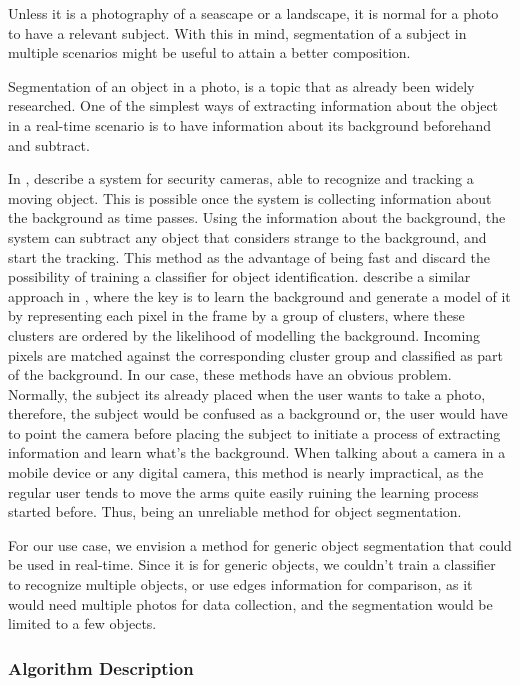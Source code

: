 Unless it is a photography of a seascape or a landscape, it is normal for a photo to have a relevant subject. With this in mind, segmentation of a subject in multiple scenarios might be useful to attain a better composition.

Segmentation of an object in a photo, is a topic that as already been widely researched. One of the simplest ways of extracting information about the object in a real-time scenario is to have information about its background beforehand and subtract. 

In \cite{yang2004real}, \citeauthor{yang2004real} describe a system for security cameras, able to recognize and tracking a moving object. This is possible once the system is collecting information about the background as time passes. Using the information about the background, the system can subtract any object that considers strange to the background, and start the tracking. This method as the advantage of being fast and discard the possibility of training a classifier for object identification. 
\citeauthor{butler2003real} describe a similar approach in \cite{butler2003real}, where the key is to learn the background and generate a model of it by representing each pixel in the frame by a group of clusters, where these clusters are ordered by the likelihood of modelling the background. Incoming pixels are matched against the corresponding cluster group and classified as part of the background.
In our case, these methods have an obvious problem. Normally, the subject its already placed when the user wants to take a photo, therefore, the subject would be confused as a background or, the user would have to point the camera before placing the subject to initiate a process of extracting information and learn what's the background. When talking about a  camera in a mobile device or any digital camera, this method is nearly impractical, as the regular user tends to move the arms quite easily ruining the learning process started before. Thus, being an unreliable method for object segmentation.

For our use case, we envision a method for generic object segmentation that could be used in real-time. Since it is for generic objects, we couldn't train a classifier to recognize multiple objects, or use edges information for comparison, as it would need multiple photos for data collection, and the segmentation would be limited to a few objects. 

\subsubsection{Algorithm Description}

